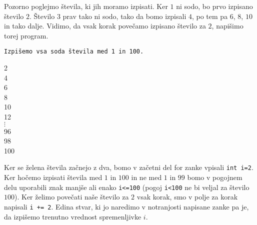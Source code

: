 Pozorno poglejmo števila, ki jih moramo izpisati. Ker $1$ ni sodo, bo prvo
izpisano število $2$. Število $3$ prav tako ni sodo, tako da bomo izpisali $4$,
po tem pa $6$, $8$, $10$ in tako dalje. Vidimo, da vsak korak povečamo izpisano
število za $2$, napišimo torej program.

\begin{examples}
\verb+Izpišemo vsa soda števila med 1 in 100.+
	
	
\begin{inout}
	2  \\
	4  \\
	6  \\
	8  \\
	10 \\
	12 \\
	$\vdots$ \\
	96 \\
	98 \\
	100
\end{inout}
	
\end{examples}

Ker se želena števila začnejo z dva, bomo v začetni del for zanke vpisali
\texttt{int i=2}. Ker hočemo izpisati števila med $1$ in $100$ in ne med $1$ in
$99$ bomo v pogojnem delu uporabili znak manjše ali enako \texttt{i<=100} 
(pogoj \texttt{i<100} ne bi veljal za število $100$). Ker želimo povečati naše 
število za $2$ vsak korak, smo v polje za korak napisali \texttt{i += 2}. 
Edina stvar, ki jo naredimo v notranjosti napisane zanke pa je, da izpišemo 
trenutno vrednost spremenljivke $i$.

